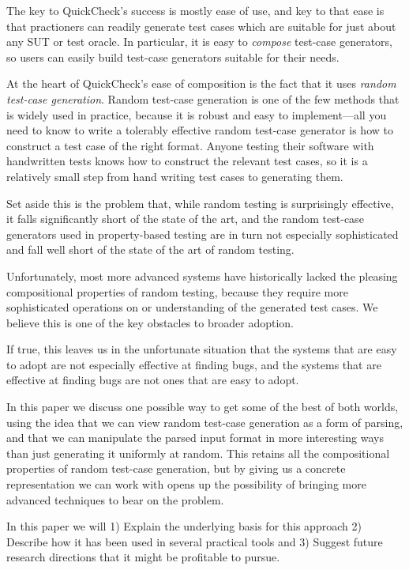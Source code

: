 \documentclass[sigplan,review]{acmart}
\begin{document}
The key to QuickCheck's success is mostly ease of use,
and key to that ease is that practioners can readily generate test cases which are suitable for just about any SUT or test oracle.
In particular, it is easy to \emph{compose} test-case generators,
so users can easily build test-case generators suitable for their needs.

At the heart of QuickCheck's ease of composition is the fact that it uses \emph{random test-case generation}.
Random test-case generation is one of the few methods that is widely used in practice, because it is robust and easy to implement---all
you need to know to write a tolerably effective random test-case generator is how to construct a test case of the right format.
Anyone testing their software with handwritten tests knows how to construct the relevant test cases,
so it is a relatively small step from hand writing test cases to generating them.

Set aside this is the problem that, while random testing is surprisingly effective,
it falls significantly short of the state of the art,
and the random test-case generators used in property-based testing are in turn not especially sophisticated and fall well short of the state of the art of random testing.

Unfortunately, most more advanced systems have historically lacked the pleasing compositional properties of random testing,
because they require more sophisticated operations on or understanding of the generated test cases.
We believe this is one of the key obstacles to broader adoption.

If true, this leaves us in the unfortunate situation that the systems that are easy to adopt are not especially effective at finding bugs,
and the systems that are effective at finding bugs are not ones that are easy to adopt.

In this paper we discuss one possible way to get some of the best of both worlds,
using the idea that we can view random test-case generation as a form of parsing,
and that we can manipulate the parsed input format in more interesting ways than just generating it uniformly at random.
This retains all the compositional properties of random test-case generation,
but by giving us a concrete representation we can work with opens up the possibility of bringing more advanced techniques to bear on the problem.

In this paper we will 1) Explain the underlying basis for this approach 2) Describe how it has been used in several practical tools and 3) Suggest future research directions that it might be profitable to pursue.
\end{document}
